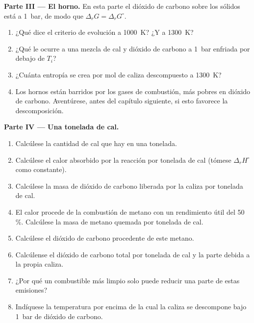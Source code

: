 \begin{problem}
\medskip
\noindent\textbf{Parte III --- El horno.}
En esta parte el dióxido de carbono sobre los sólidos está a \qty{1}{bar}, de modo
que $\Delta_r G = \Delta_r G^\circ$.
\begin{enumerate}[resume]
  \item ¿Qué dice el criterio de evolución a \qty{1000}{K}? ¿Y a
        \qty{1300}{K}?
  \item ¿Qué le ocurre a una mezcla de cal y dióxido de carbono a
        \qty{1}{bar} enfriada por debajo de $T_i$?
  \item ¿Cuánta entropía se crea por mol de caliza descompuesto a
        \qty{1300}{K}?
  \item Los hornos están barridos por los gases de combustión, más pobres en dióxido de carbono.
        Aventúrese, antes del capítulo siguiente, si esto favorece la
        descomposición.
\end{enumerate}

\medskip
\noindent\textbf{Parte IV --- Una tonelada de cal.}
\begin{enumerate}[resume]
  \item Calcúlese la cantidad de cal que hay en una tonelada.
  \item Calcúlese el calor absorbido por la reacción por tonelada de cal
        (tómese $\Delta_r H^\circ$ como constante).
  \item Calcúlese la masa de dióxido de carbono liberada por la caliza por
        tonelada de cal.
  \item El calor procede de la combustión de metano con un rendimiento útil del
        50\,\%. Calcúlese la masa de metano quemada por tonelada de cal.
  \item Calcúlese el dióxido de carbono procedente de este metano.
  \item Calcúlense el dióxido de carbono total por tonelada de cal y la parte
        debida a la propia caliza.
  \item ¿Por qué un combustible más limpio solo puede reducir una parte de estas emisiones?
  \item Indíquese la temperatura por encima de la cual la caliza se descompone bajo
        \qty{1}{bar} de dióxido de carbono.
\end{enumerate}
\end{problem}
